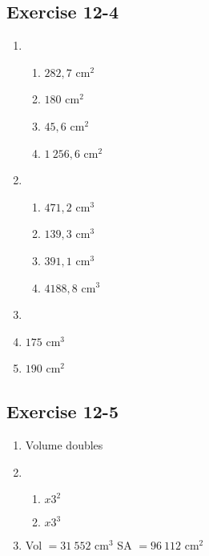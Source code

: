 \subsection{Exercise 12-4} %
\begin{enumerate}[itemsep=6pt, label=\textbf{\arabic*}. ] 
\item %
\begin{enumerate}[noitemsep, label=\textbf{\alph*}. ]
 \item $282,7$ cm$^2$
\item $180$ cm$^2$
\item  $45,6$ cm$^2$
\item $1~256,6$ cm$^2$
\end{enumerate}
\item %
\begin{enumerate}[noitemsep, label=\textbf{\alph*}. ]
 \item $471,2$ cm$^3$
\item $139,3$ cm$^3$
\item  $391,1$ cm$^3$
\item $4188,8$ cm$^3$
\end{enumerate}
\item %
\item $175$ cm$^3$
\item $190$ cm$^2$

\end{enumerate}
\subsection{Exercise 12-5} %
\begin{enumerate}[noitemsep, label=\textbf{\arabic*}. ] 
 \item Volume doubles%
\item %
\begin{enumerate}[noitemsep, label=\textbf{(\alph*)} ] 
\item $x3^2$%
\item $x3^3$%
\end{enumerate}
\item Vol $=31~ 552$ cm$^3$ SA $=96~ 112$ cm$^2$ %
\end{enumerate}
% 

